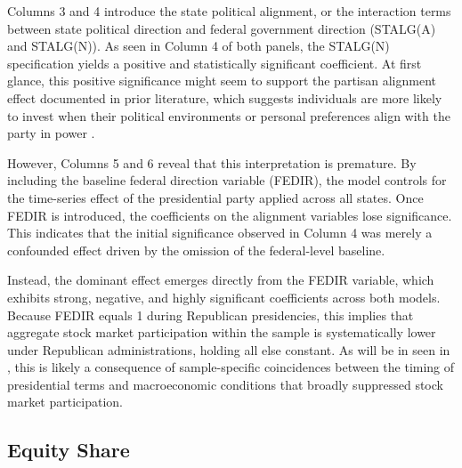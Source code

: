 Columns 3 and 4 introduce the state political alignment, or the interaction terms between state political direction and federal government direction (STALG(A) and STALG(N)). As seen in Column 4 of both panels, the STALG(N) specification yields a positive and statistically significant coefficient. At first glance, this positive significance might seem to support the partisan alignment effect documented in prior literature, which suggests individuals are more likely to invest when their political environments or personal preferences align with the party in power \citep{bonaparte2017, meeuwis2022}.

However, Columns 5 and 6 reveal that this interpretation is premature. By including the baseline federal direction variable (FEDIR), the model controls for the time-series effect of the presidential party applied across all states. Once FEDIR is introduced, the coefficients on the alignment variables lose significance. This indicates that the initial significance observed in Column 4 was merely a confounded effect driven by the omission of the federal-level baseline.

Instead, the dominant effect emerges directly from the FEDIR variable, which exhibits strong, negative, and highly significant coefficients across both models. Because FEDIR equals 1 during Republican presidencies, this implies that aggregate stock market participation within the sample is systematically lower under Republican administrations, holding all else constant. As will be in seen in , this is likely a consequence of sample-specific coincidences between the timing of presidential terms and macroeconomic conditions that broadly suppressed stock market participation.

\subsection{Equity Share}
\label{sec:main_eqshare}

